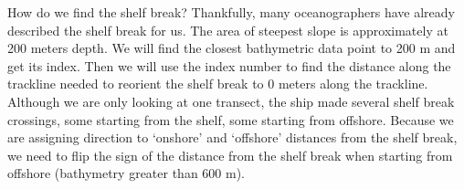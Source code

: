 \documentclass[]{article}
\newenvironment{Shaded}{\begin{snugshade}}{\end{snugshade}}
\newcommand{\DataTypeTok}[1]{\textcolor[rgb]{0.13,0.29,0.53}{#1}}
\newcommand{\DecValTok}[1]{\textcolor[rgb]{0.00,0.00,0.81}{#1}}
\newcommand{\FloatTok}[1]{\textcolor[rgb]{0.00,0.00,0.81}{#1}}
\newcommand{\KeywordTok}[1]{\textcolor[rgb]{0.13,0.29,0.53}{\textbf{#1}}}
\newcommand{\NormalTok}[1]{#1}
\newcommand{\OperatorTok}[1]{\textcolor[rgb]{0.81,0.36,0.00}{\textbf{#1}}}
\newcommand{\StringTok}[1]{\textcolor[rgb]{0.31,0.60,0.02}{#1}}
\begin{document}
How do we find the shelf break? Thankfully, many oceanographers have
already described the shelf break for us. The area of steepest slope is
approximately at 200 meters depth. We will find the closest bathymetric
data point to 200 m and get its index. Then we will use the index number
to find the distance along the trackline needed to reorient the shelf
break to 0 meters along the trackline. Although we are only looking at
one transect, the ship made several shelf break crossings, some starting
from the shelf, some starting from offshore. Because we are assigning
direction to `onshore' and `offshore' distances from the shelf break, we
need to flip the sign of the distance from the shelf break when starting
from offshore (bathymetry greater than 600 m).

\begin{Shaded}
\end{Shaded}
\end{document}
